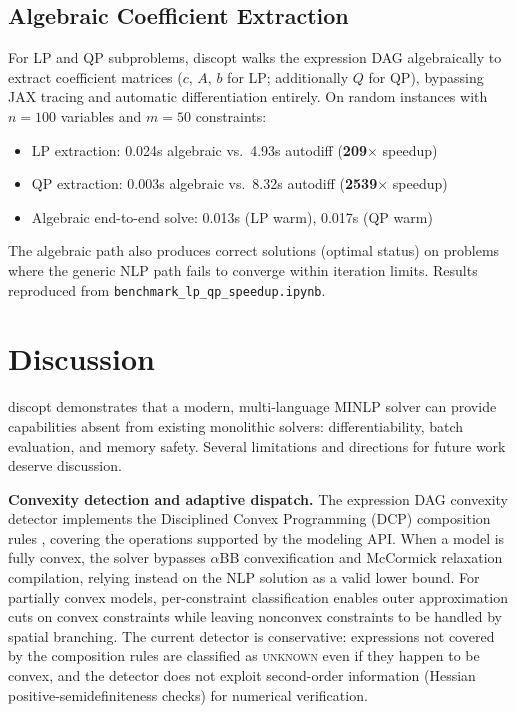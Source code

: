 \documentclass[12pt,preprint]{article}
\begin{document}
\subsection{Algebraic Coefficient Extraction}
\label{org-performance}
For LP and QP subproblems, discopt walks the expression DAG algebraically to extract coefficient matrices ($c$, $A$, $b$ for LP; additionally $Q$ for QP), bypassing JAX tracing and automatic differentiation entirely. On random instances with $n = 100$ variables and $m = 50$ constraints:

\begin{itemize}
\item LP extraction: 0.024s algebraic vs.\ 4.93s autodiff (\textbf{209$\times$} speedup)
\item QP extraction: 0.003s algebraic vs.\ 8.32s autodiff (\textbf{2539$\times$} speedup)
\item Algebraic end-to-end solve: 0.013s (LP warm), 0.017s (QP warm)
\end{itemize}

The algebraic path also produces correct solutions (optimal status) on problems where the generic NLP path fails to converge within iteration limits. Results reproduced from \texttt{benchmark\_lp\_qp\_speedup.ipynb}.


\section{Discussion}
\label{org-discussion}
discopt demonstrates that a modern, multi-language MINLP solver can provide capabilities absent from existing monolithic solvers: differentiability, batch evaluation, and memory safety. Several limitations and directions for future work deserve discussion.

\textbf{Convexity detection and adaptive dispatch.} The expression DAG convexity detector implements the Disciplined Convex Programming (DCP) composition rules \cite{Boyd2004}, covering the operations supported by the modeling API. When a model is fully convex, the solver bypasses $\alpha$BB convexification and McCormick relaxation compilation, relying instead on the NLP solution as a valid lower bound. For partially convex models, per-constraint classification enables outer approximation cuts on convex constraints while leaving nonconvex constraints to be handled by spatial branching. The current detector is conservative: expressions not covered by the composition rules are classified as \textsc{unknown} even if they happen to be convex, and the detector does not exploit second-order information (Hessian positive-semidefiniteness checks) for numerical verification.
\end{document}

